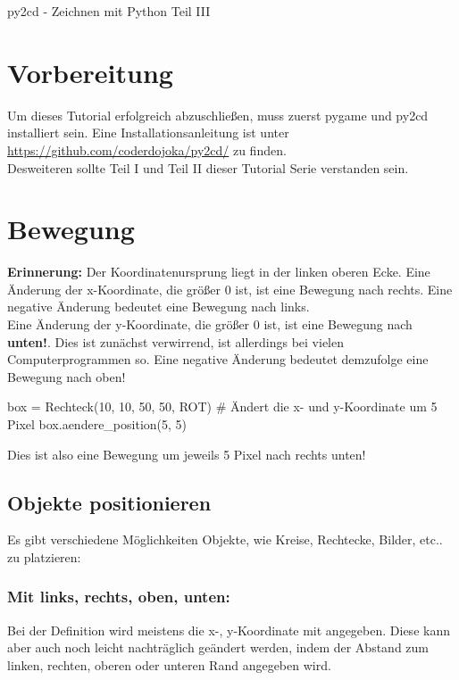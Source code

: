 \documentclass{\VorlagenPfad/coderdojokatext}
\newcommand{\Titel}{py2cd - Zeichnen mit Python Teil III}
\begin{document}
\begin{center}
	{\huge \Titel}
\end{center}

\section{Vorbereitung}
Um dieses Tutorial erfolgreich abzuschließen, muss zuerst pygame und py2cd installiert sein. Eine Installationsanleitung ist unter \url{https://github.com/coderdojoka/py2cd/} zu finden.
\\
Desweiteren sollte Teil I und Teil II dieser Tutorial Serie verstanden sein.
\section{Bewegung}

\begin{merkbox}
\textbf{Erinnerung:} Der Koordinatenursprung  liegt in der linken oberen Ecke.
Eine Änderung der x-Koordinate, die größer 0 ist, ist eine Bewegung nach rechts. Eine negative Änderung bedeutet eine Bewegung nach links.	
\\
Eine Änderung der y-Koordinate, die größer 0 ist, ist eine Bewegung nach \textbf{unten!}. Dies ist zunächst verwirrend, ist allerdings bei vielen Computerprogrammen so. Eine negative Änderung bedeutet demzufolge eine Bewegung nach oben!	

\begin{pythoncode}
box = Rechteck(10, 10, 50, 50, ROT)
# Ändert die x- und y-Koordinate um 5 Pixel
box.aendere_position(5, 5)
\end{pythoncode}

Dies ist also eine Bewegung um jeweils 5 Pixel nach rechts unten!
\end{merkbox}

\subsection{Objekte positionieren}
Es gibt verschiedene Möglichkeiten Objekte, wie Kreise, Rechtecke, Bilder, etc.. zu platzieren:

\subsubsection{Mit links, rechts, oben, unten:}
Bei der Definition wird meistens die x-, y-Koordinate mit angegeben. Diese kann aber auch noch leicht nachträglich geändert werden, indem der Abstand zum linken, rechten, oberen oder unteren Rand angegeben wird.
\end{document}
